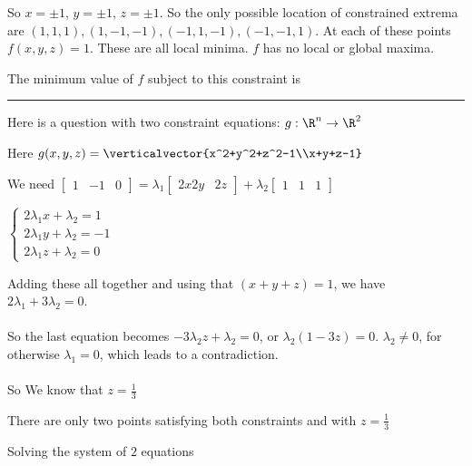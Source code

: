 \documentclass{ximera}
\begin{document}
\begin{question}
\begin{solution}
\begin{hint}
					  
					\)
			\end{hint}
			\begin{hint}
				So $x=\pm 1$, $y= \pm 1$, $z = \pm 1$.  So the only possible location of constrained extrema are $(1,1,1),(1,-1,-1),(-1,1,-1),(-1,-1,1)$.  At each of these points
				$f(x,y,z) =1$.  These are all local minima.  $f$ has no local or global maxima.
			\end{hint}
			The minimum value of $f$ subject to this constraint is 
		\end{solution}
		
	\end{question}

	\hrule

	Here is a question with two constraint equations:  $g:\R^n \to \R^2$
	
	\begin{question}
		\begin{hint}
			Here $g(x,y,z) = \verticalvector{x^2+y^2+z^2-1\\x+y+z-1}$
		\end{hint}
		\begin{hint}
			We need \( \begin{bmatrix} 1 & -1 & 0\end{bmatrix} = \lambda_1 \begin{bmatrix} 2x 2y&2z\end{bmatrix}+ \lambda_2\begin{bmatrix}  1 & 1 & 1\end{bmatrix}\)
		\end{hint}
		\begin{hint}
				\(\begin{cases}
					2\lambda_1 x+\lambda_2 = 1\\
					2\lambda_1 y+\lambda_2 = -1\\
					2\lambda_1 z+\lambda_2 = 0 
				\end{cases}\)
				
				Adding these all together and using that $(x+y+z)=1$, we have $2\lambda_1+3\lambda_2 = 0$.
				\\
				\\
				So the last equation becomes $-3\lambda_2 z+\lambda_2 = 0$, or $\lambda_2(1-3z) = 0$.  $\lambda_2 \neq 0$, for otherwise $\lambda_1=0$, which leads to 
				a contradiction.
				\\
				\\
				So We know that $z = \frac{1}{3}$
		\end{hint}
		\begin{hint}
			There are only two points satisfying both constraints and with $z = \frac{1}{3}$
		\end{hint}
		\begin{hint}
			Solving the system of $2$ equations
			

\end{hint}
\end{question}
\end{document}

